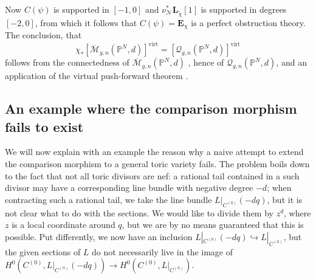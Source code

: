 \documentclass[11pt]{amsart}
\newcommand{\M}[4]{\overline{\mathcal{M}}_{#1,#2}(#3,#4)}
\newcommand{\Q}[4]{\mathcal{Q}_{#1,#2}(#3,#4)}
\newcommand{\PP}{\mathbb P}
\renewcommand{\to}{\rightarrow}
\newcommand{\comp}{\chi}
\newcommand{\virt}[1]{[#1]^{\operatorname{virt}}}
\theoremstyle{definition}
\theoremstyle{definition}
\begin{document}
\begin{center}
\end{center}
Now $C(\psi)$ is supported in $[-1,0]$ \cite[Lemma 4.20]{Manolache-Push} and $\nu_{\mathcal{N}}^*\mathbf L_{\tilde{\comp}}{[1]}$ is supported in degrees $[-2,0]$, from which it follows that $C(\psi)=\mathbf E_{\comp}$ is a perfect obstruction theory. The conclusion, that
\begin{equation*} \comp_*\virt{\M{g}{n}{\PP^N}{d}}=\virt{\Q{g}{n}{\PP^N}{d}} \end{equation*}
follows from the connectedness of $\M{g}{n}{\PP^N}{d}$ \cite{KP}, hence of $\Q{g}{n}{\PP^N}{d}$, and an application of the virtual push-forward theorem \cite[Proposition 4.21]{Manolache-Push}.

\subsection{An example where the comparison morphism fails to exist}
We will now explain with an example the reason why a naive attempt to extend the comparison morphism to a general toric variety fails. The problem boils down to the fact that not all toric divisors are nef: a rational tail contained in a such divisor may have a corresponding line bundle with negative degree $-d$; when contracting such a rational tail, we take the line bundle $L|_{C^{(0)}}(-dq)$, but it is not clear what to do with the sections. We would like to divide them by $z^d$, where $z$ is a local coordinate around $q$, but we are by no means guaranteed that this is possible. Put differently, we now have an inclusion $L|_{C^{(0)}}(-dq)\hookrightarrow L|_{C^{(0)}}$, but the given sections of $L$ do not necessarily live in the image of $H^0(C^{(0)},L|_{C^{(0)}}(-dq))\to H^0(C^{(0)},L|_{C^{(0)}})$.
\end{document}
